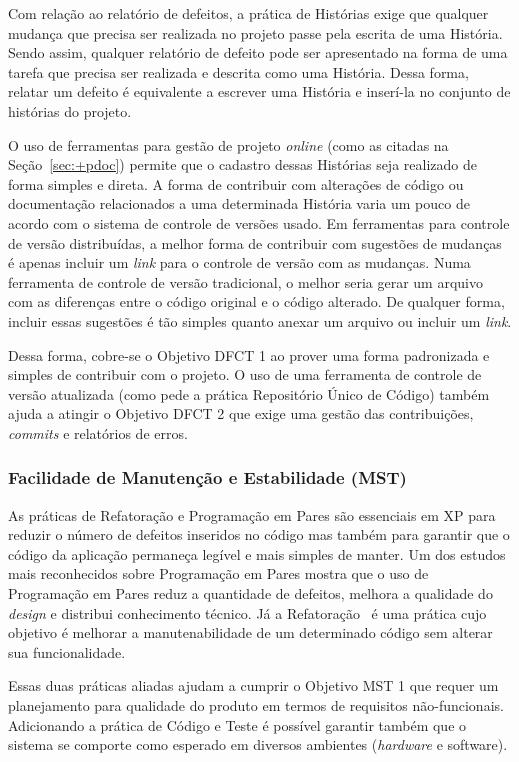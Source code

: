 Com relação ao relatório de defeitos, a prática de Histórias exige que
qualquer mudança que precisa ser realizada no projeto passe pela
escrita de uma História. Sendo assim, qualquer relatório de defeito
pode ser apresentado na forma de uma tarefa que precisa ser realizada
e descrita como uma História. Dessa forma, relatar um defeito é
equivalente a escrever uma História e inserí-la no conjunto de
histórias do projeto.

O uso de ferramentas para gestão de projeto \emph{online} (como as
citadas na Seção~\ref{sec:+pdoc}) permite que o cadastro dessas
Histórias seja realizado de forma simples e direta. A forma de
contribuir com alterações de código ou documentação relacionados a uma
determinada História varia um pouco de acordo com o sistema de
controle de versões usado. Em ferramentas para controle de versão
distribuídas, a melhor forma de contribuir com sugestões de mudanças é
apenas incluir um \textit{link} para o controle de versão com as
mudanças. Numa ferramenta de controle de versão tradicional, o melhor
seria gerar um arquivo com as diferenças entre o código original e o
código alterado. De qualquer forma, incluir essas sugestões é tão
simples quanto anexar um arquivo ou incluir um \textit{link}.

Dessa forma, cobre-se o Objetivo DFCT 1 ao prover uma forma
padronizada e simples de contribuir com o projeto. O uso de uma
ferramenta de controle de versão atualizada (como pede a prática
Repositório Único de Código) também ajuda a atingir o Objetivo DFCT 2
que exige uma gestão das contribuições, \textit{commits} e relatórios
de erros.

\subsubsection{Facilidade de Manutenção e Estabilidade (MST)}
\label{sec:+mst}

As práticas de Refatoração e Programação em Pares são essenciais em XP
para reduzir o número de defeitos inseridos no código mas também para
garantir que o código da aplicação permaneça legível e mais simples de
manter. Um dos estudos mais reconhecidos sobre Programação em Pares
\cite{Williams2000} mostra que o uso de Programação em Pares reduz a
quantidade de defeitos, melhora a qualidade do \textit{design} e
distribui conhecimento técnico. Já a Refatoração~\cite{Refac01} é uma
prática cujo objetivo é melhorar a manutenabilidade de um determinado
código sem alterar sua funcionalidade.

Essas duas práticas aliadas ajudam a cumprir o Objetivo MST 1 que
requer um planejamento para qualidade do produto em termos de
requisitos não-funcionais. Adicionando a prática de Código e Teste é
possível garantir também que o sistema se comporte como esperado em
diversos ambientes (\textit{hardware} e software).


